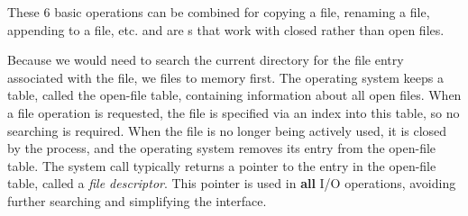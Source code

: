 These 6 basic operations can be combined for copying a file, renaming a file, appending to a file, etc.
 and  are s that work with closed rather than open files.

Because we would need to search the current directory for the file entry associated with the file, we  files to memory first.
The operating system keeps a table, called the open-file table, containing information about all open files.
When a file operation is requested, the file is specified via an index into this table, so no searching is required.
When the file is no longer being actively used, it is closed by the process, and the operating system removes its entry from the open-file table.
The  system call typically returns a pointer to the entry in the open-file table, called a \emph{file descriptor}.
This pointer is used in \textbf{all} I/O operations, avoiding further searching and simplifying the  interface.


